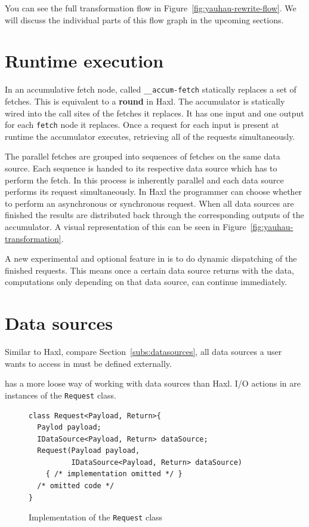 You can see the full \yauhau{} transformation flow in Figure~\ref{fig:yauhau-rewrite-flow}.
We will discuss the individual parts of this flow graph in the upcoming sections.

\section{Runtime execution}

In \yauhau{} an accumulative fetch node, called \texttt{\_\_accum-fetch} statically replaces a set of fetches.
This is equivalent to a \textbf{round} in Haxl.
The accumulator is statically wired into the call sites of the fetches it replaces.
It has one input and one output for each \texttt{fetch} node it replaces.
Once a request for each input is present at runtime the accumulator executes, retrieving all of the requests simultaneously.

The parallel fetches are grouped into sequences of fetches on the same data source.
Each sequence is handed to its respective data source which has to perform the fetch.
In \yauhau{} this process is inherently parallel and each data source performs its request simultaneously.
In Haxl the programmer can choose whether to perform an asynchronous or synchronous request.
When all data sources are finished the results are distributed back through the corresponding outputs of the accumulator.
A visual representation of this can be seen in Figure~\ref{fig:yauhau-transformation}.

A new experimental and optional feature in \yauhau{} is to do dynamic dispatching of the finished requests.
This means once a certain data source returns with the data, computations only depending on that data source, can continue immediately.

\section{Data sources}

Similar to Haxl, compare Section~\ref{subs:datasources}, all data sources a user wants to access in \yauhau{} must be defined externally.

\yauhau{} has a more loose way of working with data sources than Haxl.
I/O actions in \yauhau{} are instances of the \texttt{Request} class.

\begin{figure}[h]
\begin{verbatim}
class Request<Payload, Return>{
  Paylod payload;
  IDataSource<Payload, Return> dataSource;
  Request(Payload payload,
          IDataSource<Payload, Return> dataSource)
    { /* implementation omitted */ }
  /* omitted code */
}
\end{verbatim}
\caption{Implementation of the \texttt{Request} class}
\label{fig:request-class-implementation}
\end{figure}

